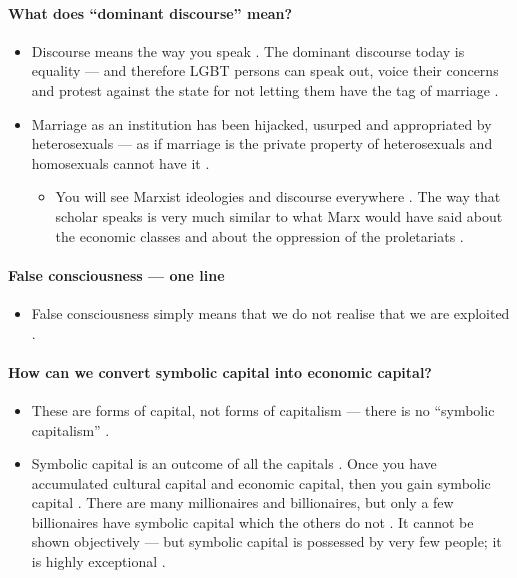 \paragraph{What does ``dominant discourse'' mean?}
\begin{itemize}
    \item Discourse means the way you speak . The dominant discourse today is equality --- and therefore LGBT persons can speak out, voice their concerns and protest against the state for not letting them have the tag of marriage .
    \item Marriage as an institution has been hijacked, usurped and appropriated by heterosexuals --- as if marriage is the private property of heterosexuals and homosexuals cannot have it .
    \begin{itemize}
        \item You will see Marxist ideologies and discourse everywhere . The way that scholar speaks is very much similar to what Marx would have said about the economic classes and about the oppression of the proletariats .
    \end{itemize}
\end{itemize}

\paragraph{False consciousness --- one line}
\begin{itemize}
    \item False consciousness simply means that we do not realise that we are exploited .
\end{itemize}

\paragraph{How can we convert symbolic capital into economic capital?}
\begin{itemize}
    \item These are forms of capital, not forms of capitalism --- there is no ``symbolic capitalism'' .
    \item Symbolic capital is an outcome of all the capitals . Once you have accumulated cultural capital and economic capital, then you gain symbolic capital . There are many millionaires and billionaires, but only a few billionaires have symbolic capital which the others do not . It cannot be shown objectively --- but symbolic capital is possessed by very few people; it is highly exceptional .
\end{itemize}

